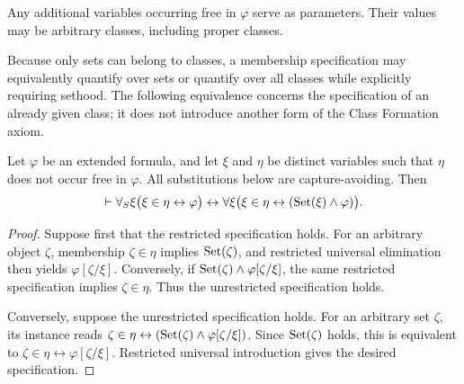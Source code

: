 Any additional variables occurring free in \(\varphi\) serve as parameters. Their values may be arbitrary classes, including proper classes.


Because only sets can belong to classes, a membership specification
may equivalently quantify over sets or quantify over all classes while
explicitly requiring sethood. The following equivalence concerns the
specification of an already given class; it does not introduce another
form of the Class Formation axiom.

\begin{metatheorem}
\label{meta:restricted-unrestricted-class-formulation}
Let \(\varphi\) be an extended formula, and let \(\xi\) and \(\eta\)
be distinct variables such that \(\eta\) does not occur free in
\(\varphi\). All substitutions below are capture-avoiding. Then
\[
\vdash
\forall_S\xi
\bigl(\xi\in\eta\leftrightarrow\varphi\bigr)
\leftrightarrow
\forall\xi
\bigl(\xi\in\eta\leftrightarrow(\operatorname{Set}(\xi)\land\varphi)\bigr).
\]
\end{metatheorem}

\begin{proof}
Suppose first that the restricted specification holds. For an
arbitrary object \(\zeta\), membership \(\zeta\in\eta\) implies
\(\operatorname{Set}(\zeta)\), and restricted universal elimination then yields
\(\varphi[\zeta/\xi]\). Conversely, if
\(\operatorname{Set}(\zeta)\land\varphi[\zeta/\xi]\), the same restricted
specification implies \(\zeta\in\eta\). Thus the unrestricted
specification holds.

Conversely, suppose the unrestricted specification holds. For an
arbitrary set \(\zeta\), its instance reads
\(\zeta\in\eta\leftrightarrow
(\operatorname{Set}(\zeta)\land\varphi[\zeta/\xi])\).
Since \(\operatorname{Set}(\zeta)\) holds, this is equivalent to
\(\zeta\in\eta\leftrightarrow\varphi[\zeta/\xi]\).
Restricted universal introduction gives the desired specification.
\end{proof}


